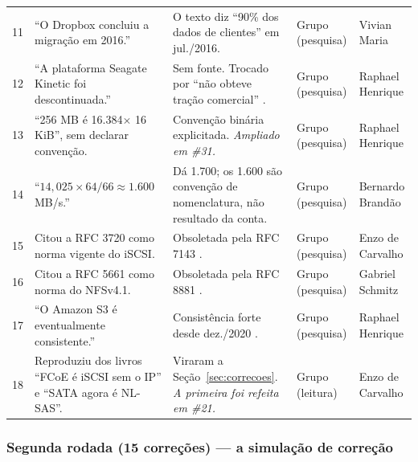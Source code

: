 \documentclass[11pt,a4paper]{article}
\begin{document}
{\begin{longtable}{@{}p{0.35cm}p{4.6cm}p{5.5cm}p{2.0cm}p{2.0cm}@{}}
11 & ``O Dropbox concluiu a migração em 2016.'' & O texto diz ``90\% dos dados de clientes'' em
jul./2016. & Grupo (pesquisa) & Vivian Maria \\
12 & ``A plataforma Seagate Kinetic foi descontinuada.'' & Sem fonte. Trocado por ``não obteve
tração comercial'' \cite{theregister2016}. & Grupo (pesquisa) & Raphael Henrique \\
13 & ``256 MB é 16.384$\times$ 16 KiB'', sem declarar convenção. & Convenção binária explicitada.
\emph{Ampliado em \#31.} & Grupo (pesquisa) & Raphael Henrique \\
14 & ``$14{,}025 \times 64/66 \approx 1.600$ MB/s.'' & Dá 1.700; os 1.600 são convenção de
nomenclatura, não resultado da conta. & Grupo (pesquisa) & Bernardo Brandão \\
15 & Citou a RFC 3720 como norma vigente do iSCSI. & Obsoletada pela RFC 7143 \cite{rfc7143}. &
Grupo (pesquisa) & Enzo de Carvalho \\
16 & Citou a RFC 5661 como norma do NFSv4.1. & Obsoletada pela RFC 8881 \cite{rfc8881}. &
Grupo (pesquisa) & Gabriel Schmitz \\
17 & ``O Amazon S3 é eventualmente consistente.'' & Consistência forte desde dez./2020
\cite{awss3faq}. & Grupo (pesquisa) & Raphael Henrique \\
18 & Reproduziu dos livros ``FCoE é iSCSI sem o IP'' e ``SATA agora é NL-SAS''. & Viraram a
Seção~\ref{sec:correcoes}. \emph{A primeira foi refeita em \#21.} & Grupo (leitura) &
Enzo de Carvalho \\
\end{longtable}}

\subsubsection*{Segunda rodada (15 correções) --- a simulação de correção}
\end{document}
